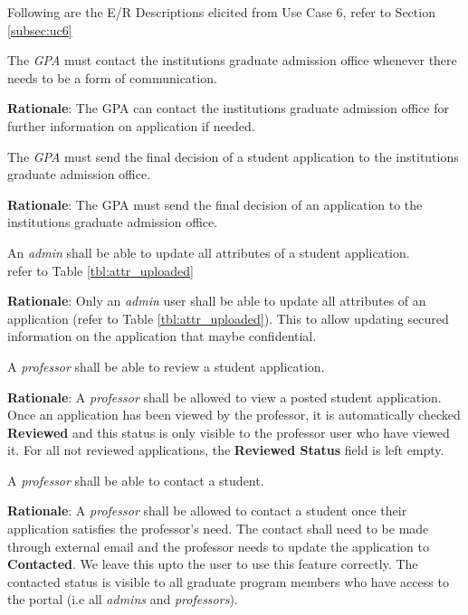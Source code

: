 \documentclass[fontsize=12pt,paper=letter,twoside]{scrartcl}
\begin{document}
Following are the E/R Descriptions elicited from Use Case 6, refer to Section \ref{subsec:uc6}

\genenv
{The \emph{GPA} must contact the institutions graduate admission office whenever there needs to be a form of communication. \\}
{}
\label{E4}

\smallskip
\noindent \textbf{Rationale}: The GPA can contact the institutions graduate admission office for further information on application if needed.

\genenv
{The \emph{GPA} must send the final decision of a student application to the institutions graduate admission office. \\}
{}
\label{E5}

\smallskip
\noindent \textbf{Rationale}: The GPA must send the final decision of an application to the institutions graduate admission office.

\rdescription
{An \emph{admin} shall be able to update all attributes of a student application.\\}
{refer to Table \ref{tbl:attr_uploaded}}
\label{R20}

\smallskip
\noindent \textbf{Rationale}: Only an \emph{admin} user shall be able to update all attributes of an application (refer to Table \ref{tbl:attr_uploaded}). This to allow updating secured information on the application that maybe confidential.

\genreq
{A \emph{professor} shall be able to review a student application.\\}
{}
\label{R22}

\smallskip
\noindent \textbf{Rationale}: A \emph{professor} shall be allowed to view a posted student application. Once an application has been viewed by the professor, it is automatically checked \textbf{Reviewed} and this status is only visible to the professor user who have viewed it. For all not reviewed applications, the \textbf{Reviewed Status} field is left empty.

\genreq
{A \emph{professor} shall be able to contact a student.\\}
{}
\label{R23}

\smallskip
\noindent \textbf{Rationale}: A \emph{professor} shall be allowed to contact a student once their application satisfies the professor's need. The contact shall need to be made through external email and the professor needs to update the application to \textbf{Contacted}. We leave this upto the user to use this feature correctly. The contacted status is visible to all graduate program members who have access to the portal (i.e all \emph{admins} and \emph{professors}).
\end{document}
